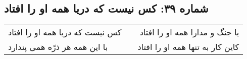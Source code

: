 \begin{center}
\section*{شماره ۳۹: کس نیست که دریا همه او را افتاد}
\label{sec:039}
\begin{longtable}{l p{0.5cm} r}
کس نیست که دریا همه او را افتاد
&&
یا جنگ و مدارا همه او را افتاد
\\
با این همه هر ذرّه همی پندارد
&&
کاین کار به تنها همه او را افتاد
\\
\end{longtable}
\end{center}
